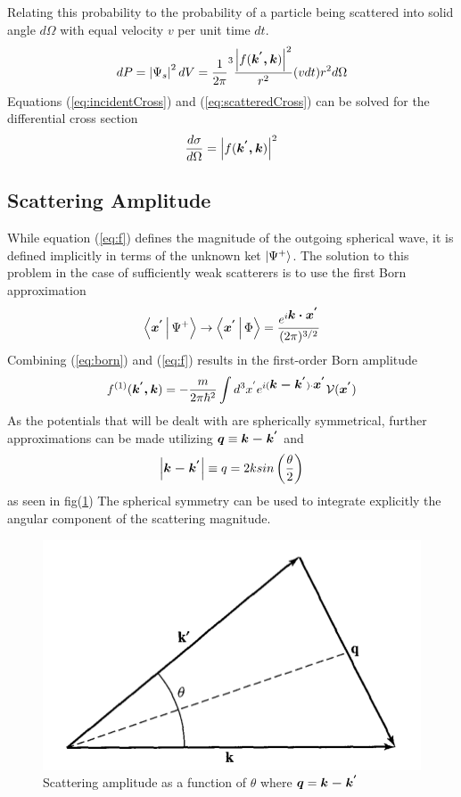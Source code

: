 Relating this probability to the probability of a particle being scattered into solid angle $d\Omega$ with equal velocity $v$ per unit time $dt$. 
\begin{equation}
\label{eq:scatteredCross}
dP=\left|\Psi_s\right|^2dV = \frac{1}{2\pi}^3 \frac{\left|f(\mbox{\boldmath$k^{'},k$})\right|^2}{r^2}(vdt)r^2 d\Omega
\end{equation}
Equations (\ref{eq:incidentCross}) and (\ref{eq:scatteredCross}) can be solved for the differential cross section 
\begin{equation}
\label{eq:differentialCrossSection}
\frac{d\sigma}{d\Omega}= \left|f(\mbox{\boldmath$k^{'},k$})\right|^2
\end{equation}

\subsection{Scattering Amplitude}
While equation (\ref{eq:f}) defines the magnitude of the outgoing spherical wave, it is defined implicitly in terms of the unknown ket $\Ket{\Psi^{+}}$. The solution to this problem in the case of sufficiently weak scatterers is to use the first Born approximation \cite{sakurai}
\begin{equation}
\label{eq:born}
\Braket{\mbox{\boldmath$x^{'}$}|\Psi^{+}} \rightarrow \Braket{\mbox{\boldmath$x^{'}$}| \Phi} = \frac{e^{i\mbox{\boldmath$k\cdot x^{'}$}}}{(2\pi)^{3/2}}
\end{equation}
Combining (\ref{eq:born}) and (\ref{eq:f}) results in the first-order Born amplitude \cite{sakurai}
\begin{equation}
\label{eq:firstOrderBorn}
f^{(1)}(\mbox{\boldmath$k^{'},k$}) = -\frac{m}{2\pi\hbar^2}\int d^3x^{'}e^{i(\mbox{\boldmath$k-k^{'}$})\cdot \mbox{\boldmath$x^{'}$}}\mathcal{V}(\mbox{\boldmath$x^{'}$})
\end{equation}
As the potentials that will be dealt with are spherically symmetrical, further approximations can be made utilizing $\mbox{\boldmath$q$} \equiv \mbox{\boldmath$k-k^{'}$}$ and $$\left|\mbox{\boldmath$k-k^{'}$}\right| \equiv  q = 2ksin \left( \frac{\theta}{2}\right)$$ as seen in fig(\ref{fig:scatteringAngle}) The spherical symmetry can be used to integrate explicitly the angular component of the scattering magnitude. \cite{sakurai}
\begin{figure}[ht!]
\centering
\includegraphics[scale=0.5]{Figures/scatteringAngle.png}
\caption{Scattering amplitude as a function of $\theta$ where $\mbox{\boldmath$q$}=\mbox{\boldmath$k-k^{'}$}$ \cite{sakurai}}
\label{fig:scatteringAngle}
\end{figure}
